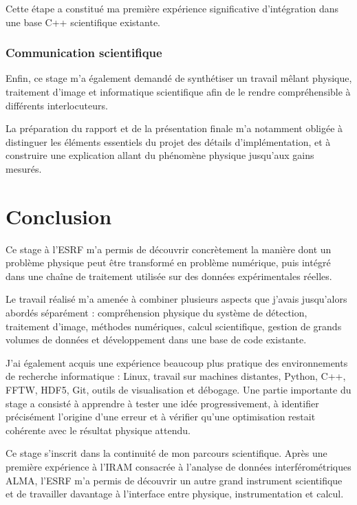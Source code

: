 \documentclass[11pt,a4paper]{report}
\begin{document}
Cette étape a constitué ma première expérience significative d'intégration
dans une base C++ scientifique existante.

\subsection{Communication scientifique}

Enfin, ce stage m'a également demandé de synthétiser un travail mêlant
physique, traitement d'image et informatique scientifique afin de le rendre
compréhensible à différents interlocuteurs.

La préparation du rapport et de la présentation finale m'a notamment
obligée à distinguer les éléments essentiels du projet des détails
d'implémentation, et à construire une explication allant du phénomène
physique jusqu'aux gains mesurés.




\chapter*{Conclusion}

Ce stage à l'ESRF m'a permis de découvrir concrètement la manière dont un
problème physique peut être transformé en problème numérique, puis intégré
dans une chaîne de traitement utilisée sur des données expérimentales
réelles.

Le travail réalisé m'a amenée à combiner plusieurs aspects que j'avais
jusqu'alors abordés séparément : compréhension physique du système de
détection, traitement d'image, méthodes numériques, calcul scientifique,
gestion de grands volumes de données et développement dans une base de code
existante.

J'ai également acquis une expérience beaucoup plus pratique des
environnements de recherche informatique : Linux, travail sur machines
distantes, Python, C++, FFTW, HDF5, Git, outils de visualisation et
débogage. Une partie importante du stage a consisté à apprendre à tester une
idée progressivement, à identifier précisément l'origine d'une erreur et à
vérifier qu'une optimisation restait cohérente avec le résultat physique
attendu.

Ce stage s'inscrit dans la continuité de mon parcours scientifique. Après
une première expérience à l'IRAM consacrée à l'analyse de données
interférométriques ALMA, l'ESRF m'a permis de découvrir un autre grand
instrument scientifique et de travailler davantage à l'interface entre
physique, instrumentation et calcul.
\end{document}
